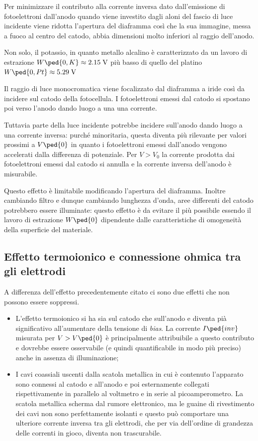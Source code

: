 \documentclass[10pt, a4paper, italian]{article}
\begin{document}
Per minimizzare il contributo alla corrente inversa dato dall'emissione di
fotoelettroni dall'anodo quando viene investito dagli aloni del fascio di
luce incidente viene ridotta l'apertura del diaframma così che la sua
immagine, messa a fuoco al centro del catodo, abbia dimensioni molto
inferiori al raggio dell'anodo.

Non solo, il potassio, in quanto metallo alcalino è caratterizzato da un
lavoro di estrazione $W\ped{0, K} \approx 2.15 \; \si{\V}$ più basso di quello
del platino $W\ped{0, Pt} \approx 5.29 \; \si{\V}$

Il raggio di luce monocromatica viene focalizzato dal diaframma a iride così da incidere sul catodo della fotocellula. I fotoelettroni emessi dal catodo si spostano poi verso l'anodo dando luogo a una una corrente.

Tuttavia parte della luce incidente potrebbe incidere sull'anodo dando luogo a una corrente inversa: purché minoritaria, questa diventa più rilevante per valori prossimi a $V\ped{0}$ in quanto i fotoelettroni emessi dall'anodo vengono accelerati dalla differenza di potenziale. Per $ V > V_{0} $ la corrente prodotta dai fotoelettroni emessi dal catodo si annulla e la corrente inversa dell'anodo è misurabile.

Questo effetto è limitabile modificando l'apertura del diaframma. Inoltre cambiando filtro e dunque cambiando lunghezza d'onda, aree differenti del catodo potrebbero essere illuminate: questo effetto è da evitare il più possibile essendo il lavoro di estrazione $W\ped{0}$ dipendente dalle caratteristiche di omogeneità della superficie del materiale.

\subsection{Effetto termoionico e connessione ohmica tra gli elettrodi}
A differenza dell'effetto precedentemente citato ci sono due effetti che non possono essere soppressi.
\begin{itemize}
    \item L'effetto termoionico si ha sia sul catodo che sull'anodo e diventa pià significativo all'aumentare della tensione di \emph{bias}. La corrente $ I\ped{inv} $ misurata per $ V > V\ped{0}$ è principalmente attribuibile a questo contributo e dovrebbe essere osservabile (e quindi quantificabile in modo più preciso) anche in assenza di illuminazione;

    \item I cavi coassiali uscenti dalla scatola metallica in cui è contenuto l'apparato sono connessi al catodo e all'anodo e poi esternamente collegati rispettivamente in parallelo al voltmetro e in serie al picoamperometro. La scatola metallica scherma dal rumore elettronico, ma le guaine di rivestimento dei cavi non sono perfettamente isolanti e questo può comportare una ulteriore corrente inversa tra gli elettrodi, che per via dell'ordine di grandezza delle correnti in gioco, diventa non trascurabile.
\end{itemize}
\end{document}
